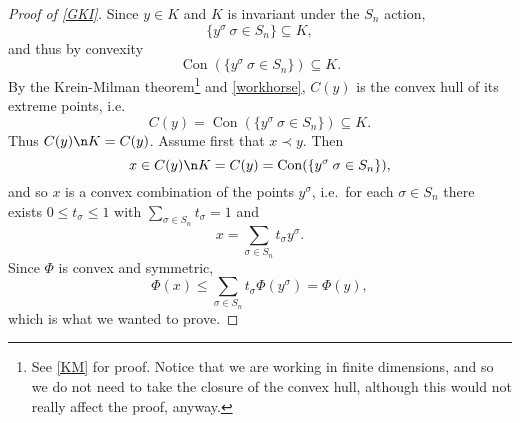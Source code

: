 \documentclass[12pt]{amsart}
\DeclareMathOperator{\Con}{Con}
\begin{document}
\begin{proof}[Proof of \cref{GKI}]Since $y \in K$ and $K$ is invariant under the $S_n$ action, \[\{y^\sigma \: \sigma \in S_n\} \subseteq K,\] and thus by convexity
\[\Con(\{y^\sigma \: \sigma \in S_n\}) \subseteq K.\] By the Krein-Milman theorem\footnote{See \cref{KM} for proof. Notice that we are working in finite dimensions, and so we do not need to take the closure of the convex hull, although this would not really affect the proof, anyway.} and \cref{workhorse}, $C(y)$ is the convex hull of its extreme points, i.e.\
\[C(y) = \Con(\{y^\sigma \: \sigma \in S_n\}) \subseteq K.\] Thus $C(y) \n K = C(y)$. Assume first that $x \prec y$. Then 
\[x \in C(y) \n K = C(y) = \Con(\{y^\sigma \: \sigma \in S_n\}),\] and so $x$ is a convex combination of the points $y^\sigma$, i.e.\ for each $\sigma \in S_n$ there exists $0 \leq t_\sigma \leq 1$ with $\sum_{\sigma \in S_n} t_\sigma = 1$ and 
\[x = \sum_{\sigma \in S_n} t_\sigma y^\sigma.\] Since $\Phi$ is convex and symmetric,
\[\Phi(x) \leq \sum_{\sigma \in S_n} t_\sigma \Phi(y^\sigma) = \Phi(y),\]
which is what we wanted to prove.


\end{proof}
\end{document}
